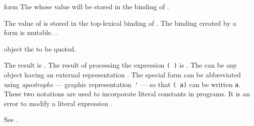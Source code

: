 \begin{optDefinition}
\begin{arguments}
    \item[form] The  whose value will be stored in the binding of
    .
\end{arguments}
%
\remarks%
The value of  is stored in the top-lexical binding of
.  The binding created by a  form is
mutable.
%
\seealso%
.

%
\Syntax
{}%
%
\begin{arguments}
    \item[object] the  to be quoted.
\end{arguments}
%
\result%
The result is .
%
\remarks%
The result of processing the expression {\tt ( )}
is .  The  can be any object having an external
representation .  The special form
 can be abbreviated using {\em apostrophe} --- graphic
representation~\verb+'+ ---
so that {\tt ( a)} can be written {\tt {}a}.  These
two notations are used to incorporate literal constants
 in programs.  It is an error to modify a
literal expression .

%
\remarks%
See .

\end{optDefinition}

